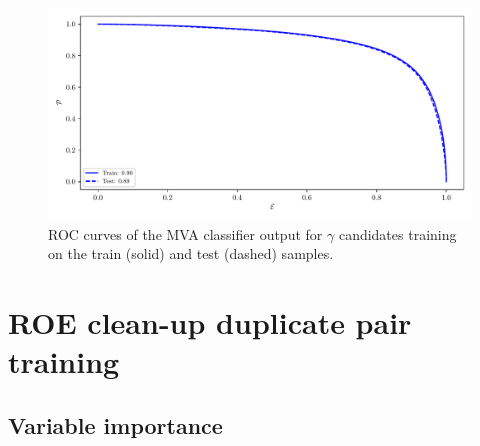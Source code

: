 \begin{figure}[H]
\centering
\captionsetup{width=0.8\linewidth}
\includegraphics[width=\linewidth]{fig/addendums/gamma_roc}
\caption{ROC curves of the MVA classifier output for $\gamma$ candidates training on the train (solid) and test (dashed) samples.}
\end{figure}

\section*{ROE clean-up duplicate pair training}\label{sec:ROE_dup}

\subsection*{Variable importance}

